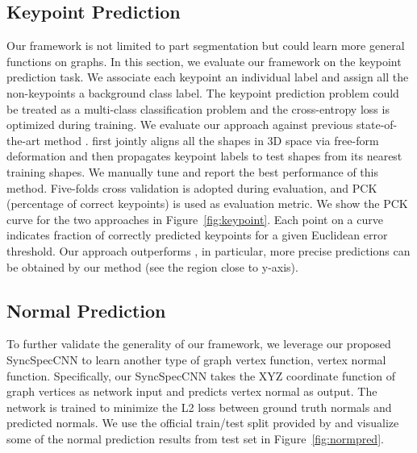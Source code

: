 \documentclass[10pt,twocolumn,letterpaper]{article}
\newcommand{\cmt}[2]{[#1: #2]}
\newcommand{\todo}[1]{\cmt{{\bf TODO}}{{\bf \color{blue} #1}}}
\begin{document}
\iffalse
\todo{
\begin{itemize}
    \item Per-category segmentation
        \subitem Baseline: SigAsia part annotation approach, anisotropic CNN, volumetric cnn
    \item Cross-category segmentation
        \subitem Compare our method with baseline method. show our method has the ability to do simultaneous classification and segmentation among very different graphs.
    \item Partial Data Part Segmentation
        \subitem Quantitatively and qualitatively show how our method performs on partial data. robust to missing points?
\end{itemize}
}
\fi

\subsection{Keypoint Prediction}
Our framework is not limited to part segmentation but could learn more general functions on graphs. In this section, we evaluate our framework on the keypoint prediction task. We associate each keypoint an individual label and assign all the non-keypoints a background class label. The keypoint prediction problem could be treated as a multi-class classification problem and the cross-entropy loss is optimized during training. We evaluate our approach against previous state-of-the-art method \cite{huang2013fine}. \cite{huang2013fine} first jointly aligns all the shapes in 3D space via free-form deformation and then propagates keypoint labels to test shapes from its  nearest training shapes. We manually tune  and report the best performance of this method. Five-folds cross validation is adopted during evaluation, and PCK (percentage of correct keypoints) is used as evaluation metric. We show the PCK curve for the two approaches in Figure~\ref{fig:keypoint}. Each point on a curve indicates fraction of correctly predicted keypoints for a given Euclidean error threshold. Our approach outperforms \cite{huang2013fine}, in particular, more precise predictions can be obtained by our method (see the region close to y-axis).

\iffalse
\todo{
We plan to manually annotate a subset of ShapeNet models and test our algorithm on supervised keypoint prediction tasks. compare with Peter's joint alignment approach.
}
\fi

\subsection{Normal Prediction}
\label{sec:normal}
To further validate the generality of our framework, we leverage our proposed SyncSpecCNN to learn another type of graph vertex function, vertex normal function. Specifically, our SyncSpecCNN takes the XYZ coordinate function of graph vertices as network input and predicts vertex normal as output. The network is trained to minimize the L2 loss between ground truth normals and predicted normals. We use the official train/test split provided by \cite{shapenet2015} and visualize some of the normal prediction results from test set in Figure~\ref{fig:normpred}.
\end{document}
